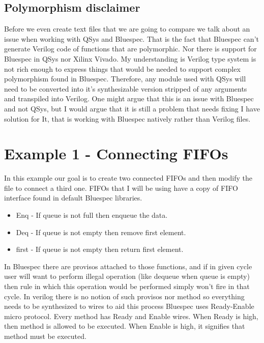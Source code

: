 \documentclass[12pt]{report}
\begin{document}
\subsection{Polymorphism disclaimer}
Before we even create text files that we are going to compare we talk about an issue when working with QSys and Bluespec. That is the fact that Bluespec can't generate Verilog code of functions that are polymorphic. Nor there is support for Bluespec in QSys nor Xilinx Vivado. My understanding is Verilog type system is not rich enough to express things that would be needed to support complex polymorphism found in Bluespec. Therefore, any module used with QSys will need to be converted into it's synthesizable version stripped of any arguments and transpiled into Verilog. One might argue that this is an issue with Bluespec and not QSys, but I would argue that it is still a problem that needs fixing I have solution for It, that is working with Bluespec natively rather than Verilog files. 


\section{Example 1 - Connecting FIFOs}
In this example our goal is to create two connected FIFOs and then modify the file to connect a third one. FIFOs that I will be using have a copy of FIFO interface found in default Bluespec libraries.
\begin{itemize}
    \item Enq - If queue is not full then enqueue the data.
    \item Deq - If queue is not empty then remove first element.
    \item first - If queue is not empty then return first element.
\end{itemize}
In Bluespec there are provisos attached to those functions, and if in given cycle user will want to perform illegal operation (like dequeue when queue is empty) then rule in which this operation would be performed simply won't fire in that cycle. In verilog there is no notion of such provisos nor method so everything needs to be synthesized to wires to aid this process Bluespec uses Ready-Enable micro protocol. Every method has Ready and Enable wires. When Ready is high, then method is allowed to be executed. When Enable is high, it signifies that method must be executed.
\end{document}
